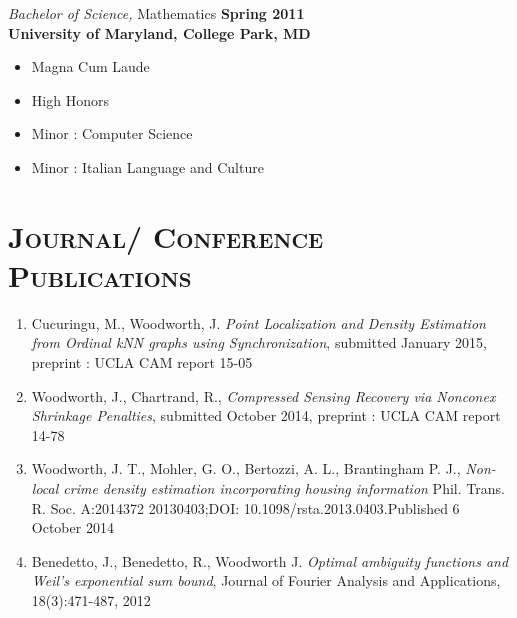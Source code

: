 \documentclass[margin, 10pt]{res} %
\begin{document}
\begin{resume}
{\sl Bachelor of Science,} Mathematics \hfill \textbf{Spring 2011}\\
\textbf{University of Maryland, College Park, MD}\\
\begin{itemize}
\item Magna Cum Laude 
\item High Honors
\item Minor : Computer Science
\item Minor : Italian Language and Culture
\end{itemize}



 
\section{\textsc{Journal/ Conference Publications}}

\begin{enumerate}
\item Cucuringu, M., Woodworth, J. {\it Point Localization and Density Estimation from Ordinal kNN graphs using Synchronization}, submitted January 2015, preprint : UCLA CAM report 15-05
\item Woodworth, J., Chartrand, R., {\it Compressed Sensing Recovery via Nonconex Shrinkage Penalties}, submitted October 2014, preprint : UCLA CAM report 14-78
\item Woodworth, J. T., Mohler, G. O., Bertozzi, A. L., Brantingham P. J., {\it Non-local crime density estimation incorporating housing information}
Phil. Trans. R. Soc. A:2014372 20130403;DOI: 10.1098/rsta.2013.0403.Published 6 October 2014
\item Benedetto, J., Benedetto, R., Woodworth J.  {\it Optimal ambiguity functions and Weil's exponential sum bound}, { Journal of Fourier Analysis and Applications,} 18(3):471-487, 2012
\end{enumerate}

 

\end{resume}
\end{document}
